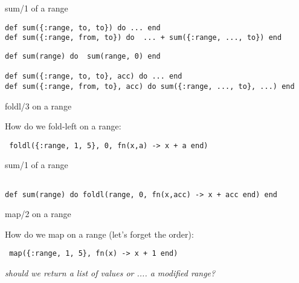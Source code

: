 \begin{frame}[fragile]{sum/1 of a range}

  \pause
\begin{verbatim}
def sum({:range, to, to}) do ... end  
def sum({:range, from, to}) do  ... + sum({:range, ..., to}) end  
\end{verbatim}

  \vspace{20pt}  \pause
  
\begin{verbatim}
def sum(range) do  sum(range, 0) end

def sum({:range, to, to}, acc) do ... end  
def sum({:range, from, to}, acc) do sum({:range, ..., to}, ...) end  
\end{verbatim}
  
  
\end{frame}

\begin{frame}[fragile]{foldl/3 on a range}

  How do we fold-left on a range:  \pause

  \vspace{20pt}

  \verb= foldl({:range, 1, 5}, 0, fn(x,a) -> x + a end)=

\end{frame}


\begin{frame}[fragile]{sum/1 of a range}


\begin{verbatim}

def sum(range) do foldl(range, 0, fn(x,acc) -> x + acc end) end

\end{verbatim}
  
\end{frame}


\begin{frame}[fragile]{map/2 on a range}

  How do we map on a range (let's forget the order):  \pause

  \vspace{20pt}

  \verb= map({:range, 1, 5}, fn(x) -> x + 1 end)= \pause

  \vspace{20pt}
  {\em should we return a list of values or .... a modified range?}

\end{frame}


